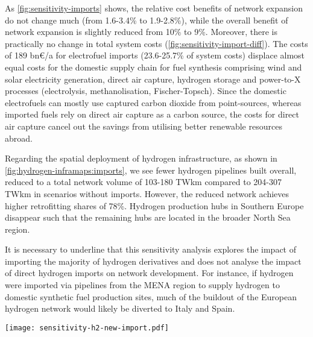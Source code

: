 As \cref{fig:sensitivity-imports} shows, the relative cost benefits of network
expansion do not change much (from 1.6-3.4\% to 1.9-2.8\%), while the overall
benefit of network expansion is slightly reduced from 10\% to 9\%. Moreover,
there is practically no change in total system costs
(\cref{fig:sensitivity-import-diff}). The costs of 189 bn\euro/a for electrofuel
imports (23.6-25.7\% of system costs) displace almost equal costs for the
domestic supply chain for fuel synthesis comprising wind and solar electricity
generation, direct air capture, hydrogen storage and power-to-X processes
(electrolysis, methanolisation, Fischer-Topsch). Since the domestic electrofuels
can mostly use captured carbon dioxide from point-sources, whereas imported
fuels rely on direct air capture as a carbon source, the costs for direct air
capture cancel out the savings from utilising better renewable resources abroad.

Regarding the spatial deployment of hydrogen infrastructure, as shown in
\cref{fig:hydrogen-inframaps:imports}, we see fewer hydrogen pipelines built
overall, reduced to a total network volume of 103-180 TWkm compared to 204-307
TWkm in scenarios without imports. However, the reduced network achieves higher
retrofitting shares of 78\%. Hydrogen production hubs in Southern Europe
disappear such that the remaining hubs are located in the broader North Sea region.

It is necessary to underline that this sensitivity analysis explores the impact
of importing the majority of hydrogen derivatives and does not analyse the
impact of direct hydrogen imports on network development. For instance, if
hydrogen were imported via pipelines from the MENA region to supply hydrogen to
domestic synthetic fuel production sites, much of the buildout of the European
hydrogen network would likely be diverted to Italy and Spain.

\begin{SCfigure}
    \centering
    \texttt{[image: sensitivity-h2-new-import.pdf]}
    \caption{Cost benefits of electricity and hydrogen network infrastructure if all liquid hydrocarbons are imported.}
    \label{fig:sensitivity-imports}
\end{SCfigure}

